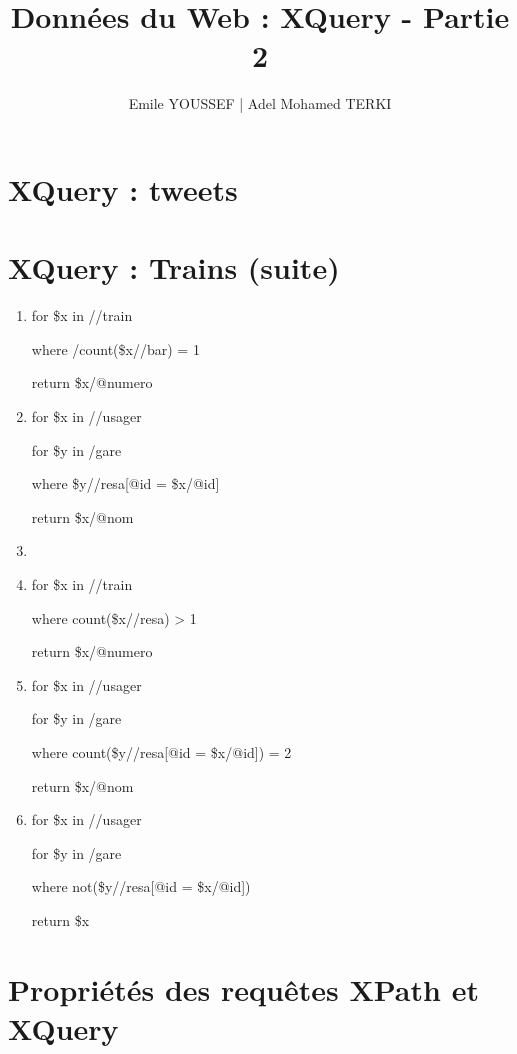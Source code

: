\documentclass{article}
\title{\textbf{Données du Web : XQuery - Partie 2}}
\author{Emile YOUSSEF | Adel Mohamed TERKI}
\date{}
\begin{document}
\maketitle

\bigskip
\section{XQuery : tweets}
\medskip

\bigskip
\section{XQuery : Trains (suite)}
\medskip

\begin{enumerate}
    \item for \$x in //train \par
    \hspace{0.25cm}where /count(\$x//bar) = 1 \par
    \hspace{0.5cm}return \$x/@numero 
    \medskip
    
    \item for \$x in //usager \par
    \hspace{0.25cm}for \$y in /gare \par
    \hspace{0.5cm}where \$y//resa[@id = \$x/@id] \par
    \hspace{0.75cm}return \$x/@nom
    \medskip
    
    \item 
    \medskip
    
    \item for \$x in //train \par
    \hspace{0.25cm}where count(\$x//resa) > 1 \par
    \hspace{0.5cm}return \$x/@numero
    \medskip
    
    \item for \$x in //usager \par
    \hspace{0.25cm}for \$y in /gare \par
    \hspace{0.5cm}where count(\$y//resa[@id = \$x/@id]) = 2 \par
    \hspace{0.75cm}return \$x/@nom
    \medskip
    
    \item for \$x in //usager \par
    \hspace{0.25cm}for \$y in /gare \par
    \hspace{0.5cm}where not(\$y//resa[@id = \$x/@id]) \par
    \hspace{0.75cm}return \$x \par
    \medskip
\end{enumerate}

\bigskip
\section{Propriétés des requêtes XPath et XQuery}
\medskip
\end{document}
